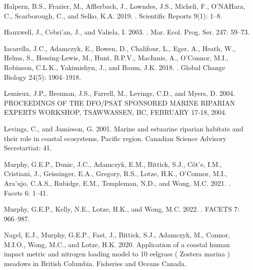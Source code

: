 \documentclass[12pt]{article}\usepackage[]{graphicx}\usepackage[]{color}
\begin{document}
\begin{CSLReferences}{1}{0}
%
Halpern, B.S., Frazier, M., Afflerbach, J., Lowndes, J.S., Micheli, F., O'NAHara, C., Scarborough, C., and Selko, K.A. 2019. . Scientific Reports 9(1): 1--8.

%
Hauxwell, J., Cebri'an, J., and Valiela, I. 2003. . Mar. Ecol. Prog. Ser. 247: 59--73.

%
Iacarella, J.C., Adamczyk, E., Bowen, D., Chalifour, L., Eger, A., Heath, W., Helms, S., Hessing-Lewis, M., Hunt, B.P.V., MacInnis, A., O'Connor, M.I., Robinson, C.L.K., Yakimishyn, J., and Baum, J.K. 2018. . Global Change Biology 24(5): 1904--1918.

%
Lemieux, J.P., Brennan, J.S., Farrell, M., Levings, C.D., and Myers, D. 2004. {PROCEEDINGS OF THE DFO}/{PSAT SPONSORED MARINE RIPARIAN EXPERTS WORKSHOP}, {TSAWWASSEN}, {BC}, {FEBRUARY} 17-18, 2004.

%
Levings, C., and Jamieson, G. 2001. Marine and estuarine riparian habitats and their role in coastal ecosystems, {Pacific} region. Canadian Science Advisory Secretartiat: 41.

%
Murphy, G.E.P., Dunic, J.C., Adamczyk, E.M., Bittick, S.J., Côt'e, I.M., Cristiani, J., Geissinger, E.A., Gregory, R.S., Lotze, H.K., O'Connor, M.I., Ara'ujo, C.A.S., Rubidge, E.M., Templeman, N.D., and Wong, M.C. 2021. . Facets 6: 1--41.

%
Murphy, G.E.P., Kelly, N.E., Lotze, H.K., and Wong, M.C. 2022. . FACETS 7: 966--987.

%
Nagel, E.J., Murphy, G.E.P., Fast, J., Bittick, S.J., Adamczyk, M., Connor, M.I.O., Wong, M.C., and Lotze, H.K. 2020. Application of a coastal human impact metric and nitrogen loading model to 10 eelgrass ( {Zostera} marina ) meadows in {British Columbia}. {Fisheries and Oceans Canada}.


\end{CSLReferences}
\end{document}
